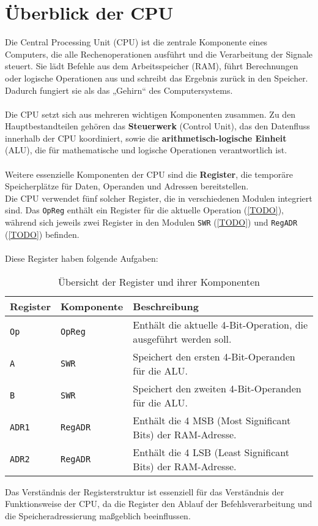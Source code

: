 \chapter{Überblick der CPU}
\label{chap:Überblick der CPU}

Die Central Processing Unit (CPU) ist die zentrale Komponente eines Computers, die alle Rechenoperationen ausführt und die
Verarbeitung der Signale steuert. Sie lädt Befehle aus dem Arbeitsspeicher (RAM), führt Berechnungen oder logische Operationen
aus und schreibt das Ergebnis zurück in den Speicher. Dadurch fungiert sie als das „Gehirn“ des Computersystems.
\\\\
Die CPU setzt sich aus mehreren wichtigen Komponenten zusammen. Zu den Hauptbestandteilen gehören das \textbf{Steuerwerk}
(Control Unit), das den Datenfluss innerhalb der CPU koordiniert, sowie die \textbf{arithmetisch-logische Einheit} (ALU),
die für mathematische und logische Operationen verantwortlich ist.
\\\\
Weitere essenzielle Komponenten der CPU sind die \textbf{Register}, die temporäre Speicherplätze für Daten,
Operanden und Adressen bereitstellen. \\ Die CPU verwendet fünf solcher Register, die in verschiedenen Modulen integriert sind.
Das \texttt{OpReg} enthält ein Register für die aktuelle Operation (\autoref{TODO}), während sich jeweils zwei Register in den
Modulen \texttt{SWR} (\autoref{TODO}) und \texttt{RegADR} (\autoref{TODO}) befinden.
\\\\
Diese Register haben folgende Aufgaben:

\begin{table}[H]
    \centering
    \begin{tabular}{|l|l|p{8cm}|}
        \hline
        \textbf{Register} & \textbf{Komponente} & \textbf{Beschreibung}                                             \\ \hline
        \texttt{Op}       & \texttt{OpReg}      & Enthält die aktuelle 4-Bit-Operation, die ausgeführt werden soll. \\ \hline
        \texttt{A}        & \texttt{SWR}        & Speichert den ersten 4-Bit-Operanden für die ALU.                 \\ \hline
        \texttt{B}        & \texttt{SWR}        & Speichert den zweiten 4-Bit-Operanden für die ALU.                \\ \hline
        \texttt{ADR1}     & \texttt{RegADR}     & Enthält die 4 MSB (Most Significant Bits) der RAM-Adresse.        \\ \hline
        \texttt{ADR2}     & \texttt{RegADR}     & Enthält die 4 LSB (Least Significant Bits) der RAM-Adresse.       \\ \hline
    \end{tabular}
    \caption{Übersicht der Register und ihrer Komponenten}
    \label{tab:register}
\end{table}

\noindent Das Verständnis der Registerstruktur ist essenziell für das Verständnis der Funktionsweise der CPU, da die Register
den Ablauf der Befehlsverarbeitung und die Speicheradressierung maßgeblich beeinflussen.
